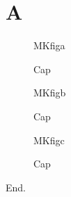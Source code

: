 \documentclass{article}
\begin{document}
\section{A}
\begin{figure}[h]\centering MKfiga\caption{Cap}\label{fig:a}\end{figure}
\newpage
\begin{figure}[h]\centering MKfigb\caption{Cap}\label{fig:b}\end{figure}
\newpage
\begin{figure}[h]\centering MKfigc\caption{Cap}\label{fig:c}\end{figure}
\newpage
End.
\end{document}
